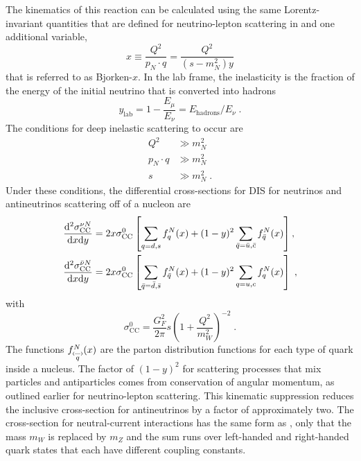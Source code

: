 The kinematics of this reaction can be calculated using the same Lorentz-invariant quantities that are defined for neutrino-lepton scattering in  and one additional variable,
\begin{equation}
    x\equiv \frac{Q^2}{p_N \cdot q} = \frac{Q^2}{(s-m_N^2)y}
\end{equation}
that is referred to as Bjorken-$x$. In the lab frame, the inelasticity is the fraction of the energy of the initial neutrino that is converted into hadrons
\begin{equation}
    y_\mathrm{lab} = 1 -\frac{E_\mu}{E_\nu} = E_\mathrm{hadrons}/E_\nu\;.
\end{equation}
The conditions for deep inelastic scattering to occur are
\begin{equation}
\begin{aligned}
    Q^2 &\gg m_N^2 \\
    p_N \cdot q &\gg m_N^2 \\
    s &\gg m_N^2\;.
\end{aligned}
\end{equation}
Under these conditions, the differential cross-sections for DIS for neutrinos and antineutrinos scattering off of a nucleon are
\begin{equation}
\begin{aligned}
    \frac{\mathrm{d}^2 \sigma_\mathrm{CC}^{\nu N}}{\mathrm{d} x \mathrm{d} y}
    &= 2x\sigma^0_\mathrm{CC} \left[
        \sum_{q=d,s} f_q^N(x) + (1 - y)^2\sum_{\bar{q}=\bar{u},\bar{c}} f_{\bar{q}}^N(x)
    \right], \\
    \frac{\mathrm{d}^2 \sigma_\mathrm{CC}^{\bar{\nu} N}}{\mathrm{d} x \mathrm{d} y}
    &= 2x\sigma^0_\mathrm{CC} \left[
        \sum_{\bar{q}=\bar{d},\bar{s}} f_{\bar{q}}^N(x) + (1 - y)^2\sum_{q=u,c} f_q^N(x)
    \right]\;,
\end{aligned}\label{eq:ccdis-xsec}
\end{equation}
with 
\begin{equation}
    \sigma_\mathrm{CC}^0 = \frac{G_F^2}{2\pi}s \left( 1 + \frac{Q^2}{m_W^2} \right)^{-2}\;.
\end{equation}
The functions $f_{\pbar{q}}^N(x)$ are the parton distribution functions for each type of quark inside a nucleus. The factor of $(1 - y)^2$ for scattering processes that mix particles and antiparticles comes from conservation of angular momentum, as outlined earlier for neutrino-lepton scattering. This kinematic suppression reduces the inclusive cross-section for antineutrinos by a factor of approximately two. The cross-section for neutral-current interactions has the same form as , only that the mass $m_W$ is replaced by $m_Z$ and the sum runs over left-handed and right-handed quark states that each have different coupling constants.
